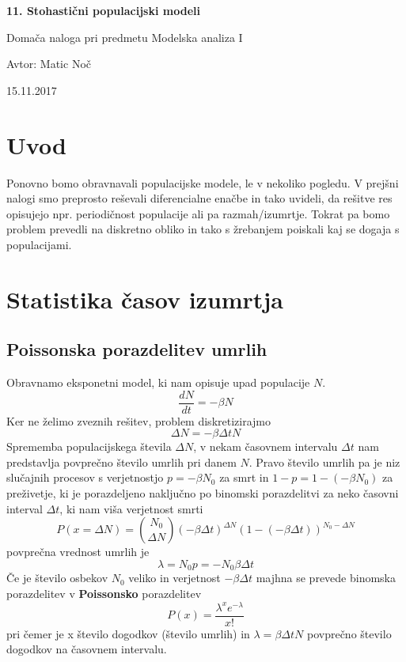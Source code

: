 \documentclass[11pt, a4paper]{article}
\begin{document}
    \begin{center}
    {\LARGE\bfseries 11. Stohastični populacijski modeli \par}
    \vspace{1cm}
    
    {\Large Domača naloga pri predmetu Modelska analiza I\par}
    \vspace{0.2cm}
    {\normalsize Avtor: Matic Noč \par}
    \vspace{0.2cm}    
    {\normalsize 15.11.2017 \par}    

    
    \end{center}
\section{Uvod}
Ponovno bomo obravnavali populacijske modele, le v nekoliko pogledu. V prejšni nalogi smo preprosto reševali diferencialne enačbe in tako uvideli, da rešitve res opisujejo npr. periodičnost populacije ali pa razmah/izumrtje. Tokrat pa bomo problem prevedli na diskretno obliko in tako s žrebanjem poiskali kaj se dogaja s populacijami.
\section{Statistika časov izumrtja}
\subsection{Poissonska porazdelitev umrlih}
Obravnamo eksponetni model, ki nam opisuje upad populacije $N$.
\begin{equation}
\frac{dN}{dt} = - \beta N
\end{equation}
Ker ne želimo zveznih rešitev, problem diskretizirajmo
\begin{equation}
\Delta N = - \beta  \Delta t N
\end{equation}
Sprememba populacijskega števila $\Delta N$, v nekam časovnem intervalu $\Delta t$ nam predstavlja povprečno število umrlih pri danem $N$. 
Pravo število umrlih pa je niz slučajnih procesov s verjetnostjo $p = -\beta N_0$ za smrt in $1 - p = 1 - (-\beta N_0)$ za preživetje, ki je porazdeljeno naključno po binomski porazdelitvi za neko časovni interval $\Delta t$, ki nam viša verjetnost smrti
\begin{equation}
P(x = \Delta N) = \binom{N_0}{\Delta N} (-\beta \Delta t )^{\Delta N } (1 - (- \beta \Delta t))^{N_0 - \Delta N}
\end{equation} 
povprečna vrednost umrlih je 
\begin{equation}
\lambda = N_0 p = -N_0 \beta \Delta t
\end{equation}
Če je število osbekov $N_0$ veliko in verjetnost $ -\beta \Delta t $ majhna se prevede binomska porazdelitev v \textbf{Poissonsko} porazdelitev
\begin{equation}
P(x) = \frac{\lambda^x e^{-\lambda}}{x!}
\end{equation}
pri čemer je x število dogodkov (število umrlih) in $\lambda = \beta \Delta t N$ povprečno število dogodkov na časovnem intervalu.
\end{document}
